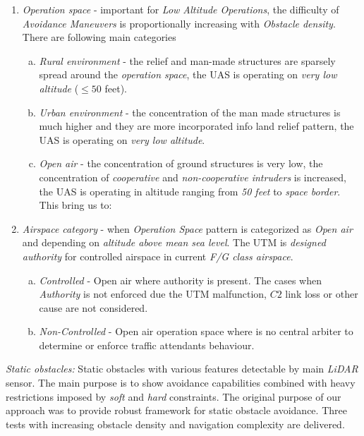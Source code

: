\begin{enumerate}
    \item \emph{Operation space} - important for \emph{Low Altitude Operations}, the difficulty of \emph{Avoidance Maneuvers} is proportionally increasing with \emph{Obstacle density}. There are following main categories
    \begin{enumerate}[a.]
        \item \emph{Rural environment} - the relief and man-made structures are sparsely spread around the \emph{operation space}, the UAS is operating on \emph{very low altitude} ($\le 50$ feet).
        
        \item \emph{Urban environment} - the concentration of the man made structures is much higher and they are more incorporated info land relief pattern, the UAS is operating on \emph{very low altitude}.
        
        \item \emph{Open air} - the concentration of ground structures is very low, the concentration of \emph{cooperative} and \emph{non-cooperative intruders} is increased, the UAS is operating in altitude ranging from \emph{50 feet} to \emph{space border}. This bring us to:
    \end{enumerate}
    
    \item \emph{Airspace category} -  when \emph{Operation Space} pattern is categorized as \emph{Open air} and depending on \emph{altitude above mean sea level}. The UTM  is \emph{designed authority} for controlled airspace in current \emph{F/G class airspace}.
    \begin{enumerate}[a.]
        \item \emph{Controlled} - Open air where authority is present. The cases when \emph{Authority} is not enforced due the UTM malfunction, $C2$ link loss or other cause are not considered.
        
        \item \emph{Non-Controlled} - Open air operation space where is no central arbiter to determine or enforce traffic attendants behaviour.
        
    \end{enumerate}
\end{enumerate}

\emph{Static obstacles:}  Static obstacles with various features detectable by main \emph{LiDAR} sensor. The main purpose is to show avoidance capabilities combined with heavy restrictions imposed by \emph{soft} and \emph{hard} constraints. The original purpose of our approach was to provide robust framework for static obstacle avoidance. Three tests with increasing obstacle density and navigation complexity are delivered.

